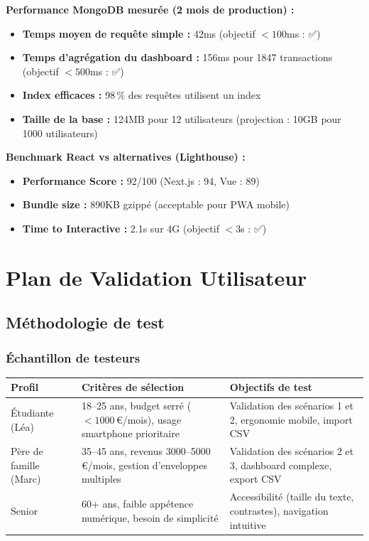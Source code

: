 \begin{tcolorbox}[colback=blue!5!white,colframe=blue!60!black,title=\textbf{Validation des choix techniques — Métriques réelles}]
\textbf{Performance MongoDB mesurée (2 mois de production) :}
\begin{itemize}
    \item \textbf{Temps moyen de requête simple :} 42ms (objectif $< 100$ms : ✅)
    \item \textbf{Temps d'agrégation du dashboard :} 156ms pour 1847 transactions (objectif $< 500$ms : ✅)
    \item \textbf{Index efficaces :} 98\,\% des requêtes utilisent un index
    \item \textbf{Taille de la base :} 124MB pour 12 utilisateurs (projection : 10GB pour 1000 utilisateurs)
\end{itemize}

\textbf{Benchmark React vs alternatives (Lighthouse) :}
\begin{itemize}
    \item \textbf{Performance Score :} 92/100 (Next.js : 94, Vue : 89)
    \item \textbf{Bundle size :} 890KB gzippé (acceptable pour PWA mobile)
    \item \textbf{Time to Interactive :} 2.1s sur 4G (objectif $< 3$s : ✅)
\end{itemize}
\end{tcolorbox}

\section{Plan de Validation Utilisateur}

\subsection{Méthodologie de test}

\subsubsection{Échantillon de testeurs}

\begin{center}
\begin{tabular}{|p{3cm}|p{4cm}|p{6.5cm}|}
\hline
\textbf{Profil} & \textbf{Critères de sélection} & \textbf{Objectifs de test} \\
\hline
Étudiante (Léa) & 18--25 ans, budget serré ($< 1000$\,€/mois), usage smartphone prioritaire & Validation des scénarios 1 et 2, ergonomie mobile, import CSV \\
\hline
Père de famille (Marc) & 35--45 ans, revenus 3000--5000\,€/mois, gestion d'enveloppes multiples & Validation des scénarios 2 et 3, dashboard complexe, export CSV \\
\hline
Senior & 60+ ans, faible appétence numérique, besoin de simplicité & Accessibilité (taille du texte, contrastes), navigation intuitive \\
\hline
\end{tabular}
\end{center}


